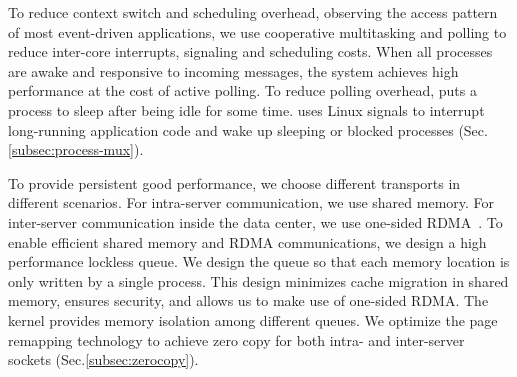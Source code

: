 To reduce context switch and scheduling overhead, observing the access pattern of most event-driven applications, we use cooperative multitasking and polling to reduce inter-core interrupts, signaling and scheduling costs. When all processes are awake and responsive to incoming messages, the system achieves high performance at the cost of active polling. To reduce polling overhead, \sys puts a process to sleep after being idle for some time. \sys uses Linux signals to interrupt long-running application code and wake up sleeping or blocked processes (Sec.\ref{subsec:process-mux}). 




 To provide persistent good performance, we choose different transports in different scenarios. For intra-server communication, we use shared memory. For inter-server communication inside the data center, we use one-sided RDMA~\cite{mitchell2013using,kaminsky2016design}. To enable efficient shared memory and RDMA communications, we design a high performance lockless queue. We design the queue so that each memory location is only written by a single process. This design minimizes cache migration in shared memory, ensures security, and allows us to make use of one-sided RDMA. The kernel provides memory isolation among different queues. We optimize the page remapping technology to achieve zero copy for both intra- and inter-server sockets (Sec.\ref{subsec:zerocopy}).

